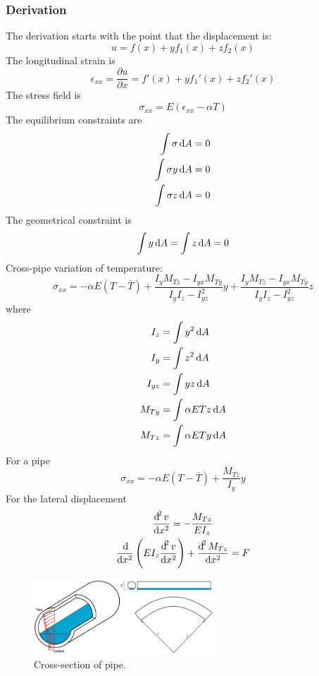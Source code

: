 \subsubsection{Derivation}
The derivation starts with the point that the displacement is:
\begin{equation}
    u = f\left(x\right) + yf_1\left(x\right) + zf_2\left(x\right)
\end{equation}
The longitudinal strain is
\begin{equation}
    \epsilon_{xx} = \frac{\partial u}{\partial x} = f'\left(x\right) + yf_1'\left(x\right) + zf_2'\left(x\right)
\end{equation}
The stress field is
\begin{equation}
    \sigma_{xx} = E \left(\epsilon_{xx} - \alpha T\right)
\end{equation}
The equilibrium constraints are
\begin{align}
    \int \sigma \dif A   & = 0 \\
    \int \sigma y \dif A & = 0 \\
    \int \sigma z \dif A & = 0
\end{align}
The geometrical constraint is
\begin{equation}
    \int y \dif A = \int z \dif A = 0
\end{equation}
Cross-pipe variation of temperature:
\begin{equation}
    \sigma_{xx} = -\alpha E\left(T - \bar{T}\right) + \frac{I_yM_{Tz}-I_{yx}M_{Ty}}{I_yI_z-I^2_{yz}}y + \frac{I_yM_{Tz}-I_{yx}M_{Ty}}{I_yI_z-I^2_{yz}}z
\end{equation}
where
\begin{align}
    I_z    & = \int y^2 \dif A        \\
    I_y    & = \int z^2 \dif A        \\
    I_{yz} & = \int yz \dif A         \\
    M_{Ty} & = \int \alpha ETz \dif A \\
    M_{Tz} & = \int \alpha ETy \dif A
\end{align}
For a pipe
\begin{equation}
    \sigma_{xx} = -\alpha E \left(T - \bar{T}\right) + \frac{M_{Tz}}{I_y}y
\end{equation}
For the lateral displacement
\begin{gather}
    \frac{\dif^2 v}{\dif x^2} = - \frac{M_{Tz}}{EI_z}\\
    \frac{\dif}{\dif x^2}\left(EI_z\frac{\dif^2 v}{\dif x^2}\right) + \frac{\dif^2 M_{Tz}}{\dif x^2} = F
\end{gather}
\begin{figure}[H]
    \centering
    \includegraphics[width = 0.6\textwidth]{img/figure62.png}
    \caption{Cross-section of pipe.}
\end{figure}